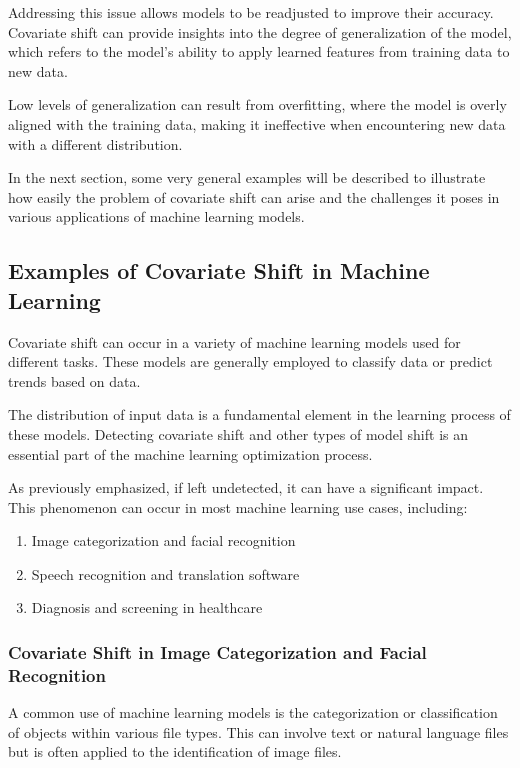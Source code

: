 Addressing this issue allows models to be readjusted to improve their accuracy. Covariate shift can provide insights into the degree of generalization of the model, which refers to the model's ability to apply learned features from training data to new data.

Low levels of generalization can result from overfitting, where the model is overly aligned with the training data, making it ineffective when encountering new data with a different distribution.  

In the next section, some very general examples will be described to illustrate how easily the problem of covariate shift can arise and the challenges it poses in various applications of machine learning models.


\subsection{Examples of Covariate Shift in Machine Learning}

Covariate shift can occur in a variety of machine learning models used for different tasks. These models are generally employed to classify data or predict trends based on data.
 
The distribution of input data is a fundamental element in the learning process of these models. Detecting covariate shift and other types of model shift is an essential part of the machine learning optimization process.

As previously emphasized, if left undetected, it can have a significant impact. This phenomenon can occur in most machine learning use cases, including:

\begin{enumerate}
    \item Image categorization and facial recognition
    \item Speech recognition and translation software
    \item Diagnosis and screening in healthcare
\end{enumerate}


\subsubsection{Covariate Shift in Image Categorization and Facial Recognition}

A common use of machine learning models is the categorization or classification of objects within various file types. This can involve text or natural language files but is often applied to the identification of image files.

